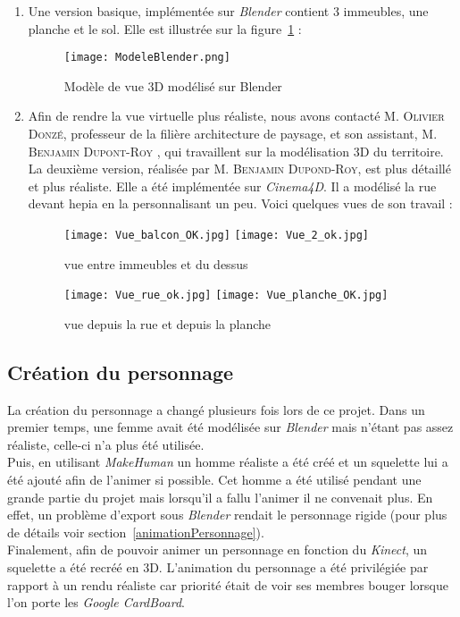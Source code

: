 \begin{enumerate}

\item Une version basique, implémentée sur \textit{Blender} contient 3 immeubles, une planche et le sol. Elle est illustrée sur la figure~\ref{ModeleBlender} : \\

\begin{figure}[H]
	\centering
		\texttt{[image: ModeleBlender.png]}
	\caption{\label{ModeleBlender} Modèle de vue 3D modélisé sur Blender}
\end{figure}

\item Afin de rendre la vue virtuelle plus réaliste, nous avons contacté \textsc{M. Olivier Donzé}, professeur de la filière architecture de paysage, et son assistant, \textsc{M. Benjamin Dupont-Roy} , qui travaillent sur la modélisation 3D du territoire. \\
La deuxième version,  réalisée par \textsc{M. Benjamin Dupond-Roy}, est plus détaillé et plus réaliste. Elle a été implémentée sur \textit{Cinema4D}. Il a modélisé la rue devant hepia en la personnalisant un peu. Voici quelques vues de son travail : \\

\begin{figure}[H]
   \texttt{[image: Vue\_balcon\_OK.jpg]}
   \texttt{[image: Vue\_2\_ok.jpg]}
   \caption{\label{vue 1 et 2} vue entre immeubles et du dessus}
\end{figure}
\begin{figure}[H]
   \texttt{[image: Vue\_rue\_ok.jpg]}
   \texttt{[image: Vue\_planche\_OK.jpg]}
   \caption{\label{vue 3 et 4} vue depuis la rue et depuis la planche}
\end{figure}

\end{enumerate}

\subsection{Création du personnage}  \label{personnages}

La création du personnage a changé plusieurs fois lors de ce projet. Dans un premier temps, une femme avait été modélisée sur \textit{Blender} mais n'étant pas assez réaliste, celle-ci n'a plus été utilisée. \\
Puis, en utilisant \textit{MakeHuman} un homme réaliste a été créé et un squelette lui a été ajouté afin de l'animer si possible.
Cet homme a été utilisé pendant une grande partie du projet mais lorsqu'il a fallu l'animer il ne convenait plus. En effet, un problème d'export sous \textit{Blender} rendait le personnage rigide (pour plus de détails voir section~\ref{animationPersonnage}). \\
Finalement, afin de pouvoir animer un personnage en fonction du \textit{Kinect}, un squelette a été recréé en 3D. L'animation du personnage a été privilégiée par rapport à un rendu réaliste car priorité était de voir ses membres bouger lorsque l'on porte les \textit{Google CardBoard}. \\

